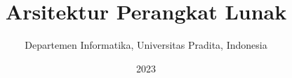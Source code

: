 \documentclass[a4paper,12pt]{book}
\begin{document}
\title{Arsitektur Perangkat Lunak}
\author{Departemen Informatika, Universitas Pradita, Indonesia}
\date{2023}

\frontmatter
\maketitle
\tableofcontents

\mainmatter















\backmatter
\end{document}
